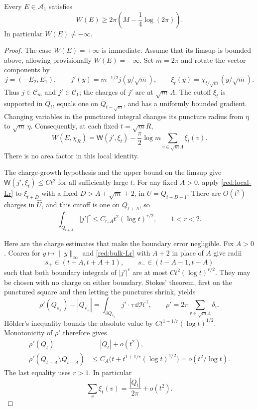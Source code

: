 \begin{lemma}\label{red:plane-bound}
Every $E\in\mathcal A_1$ satisfies
\begin{equation}\label{red:plane-lower}
 W(E)\ge 2\pi\left(M-\frac14\log(2\pi)\right).
\end{equation}
In particular $W(E)\ne-\infty$.
\end{lemma}

\begin{proof}
The case $W(E)=+\infty$ is immediate.  Assume that its limsup is
bounded above, allowing provisionally $W(E)=-\infty$.
Set $m=2\pi$ and rotate the vector components by
\[
 j=(-E_2,E_1),\qquad
 j'(y)=m^{-1/2}j(y/\sqrt m),\qquad
 \xi_t(y)=\chi_{t/\sqrt m}(y/\sqrt m).
\]
Thus $j\in\mathcal C_m$ and $j'\in\mathcal C_1$;
the charges of $j'$ are at $\sqrt m\,\Lambda$.
The cutoff $\xi_t$ is supported in $\overline Q_t$, equals one on
$\overline Q_{t-\sqrt m}$, and has a uniformly bounded gradient.
Changing variables in the punctured integral changes its puncture
radius from $\eta$ to $\sqrt m\,\eta$.  Consequently, at each fixed
$t=\sqrt m R$,
\begin{equation}\label{red:exact-scaling}
 W(E,\chi_R)=\mathsf W(j',\xi_t)
       -\frac\pi2\log m\sum_{v\in\sqrt m\Lambda}\xi_t(v).
\end{equation}
There is no area factor in this local identity.

The charge-growth hypothesis and the upper bound on the limsup give
$\mathsf W(j',\xi_t)\le Ct^2$ for all sufficiently large $t$.
For any fixed $A>0$, apply \eqref{red:local-Lr} to $\xi_{t+D}$
with a fixed $D>A+\sqrt m+2$, in $U=Q_{t+D+1}$.
There are $O(t^2)$ charges in $\widehat U$, and this cutoff is one
on $Q_{t+A}$, so
\begin{equation}\label{red:bulk-Lr}
 \int_{Q_{t+A}}|j'|^r\le C_{r,A}t^2(\log t)^{r/2},
 \qquad 1<r<2.
\end{equation}

Here are the charge estimates that make the boundary error negligible.
Fix $A>0$.  Coarea for $y\mapsto\|y\|_\infty$ and
\eqref{red:bulk-Lr} with $A+2$ in place of $A$ give radii
\[
 s_+\in(t+A,t+A+1),\qquad
 s_-\in(t-A-1,t-A)
\]
such that both boundary integrals of $|j'|^r$ are at most
$Ct^2(\log t)^{r/2}$.  They may be chosen with no charge on either
boundary.  Stokes' theorem, first on the punctured square and then
letting the punctures shrink, yields
\[
 \rho'(Q_{s_\pm})-|Q_{s_\pm}|
       =\int_{\partial Q_{s_\pm}}j'\cdot\tau\,\dd\mathcal H^1,
 \qquad \rho'=2\pi\sum_{v\in\sqrt m\Lambda}\delta_v.
\]
H\"older's inequality bounds the absolute value by
$Ct^{1+1/r}(\log t)^{1/2}$.  Monotonicity of $\rho'$ therefore gives
\begin{align}
 \rho'(Q_t)&=|Q_t|+o(t^2),\label{red:density}\\
 \rho'(Q_{t+A}\setminus Q_{t-A})
 &\le C_A\bigl(t+t^{1+1/r}(\log t)^{1/2}\bigr)
   =o(t^2/\log t).\label{red:strip}
\end{align}
The last equality uses $r>1$.  In particular
\begin{equation}\label{red:weighted-density}
 \sum_v\xi_t(v)=\frac{|Q_t|}{2\pi}+o(t^2).
\end{equation}


\end{proof}
